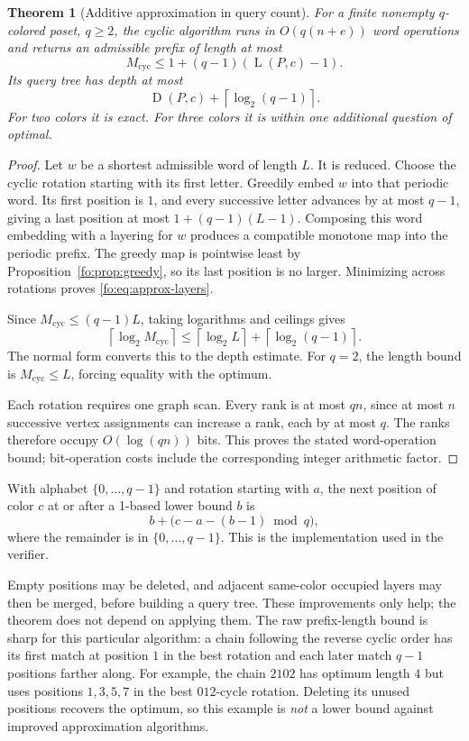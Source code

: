 \documentclass[11pt,letterpaper]{article}
\numberwithin{equation}{section}
\newtheorem{theorem}{Theorem}[section]
\theoremstyle{definition}
\theoremstyle{remark}
\theoremstyle{definition}
\newcommand{\ceil}[1]{\left\lceil#1\right\rceil}
\newcommand{\depth}{\operatorname{D}}
\newcommand{\layers}{\operatorname{L}}
\newcommand{\cyc}{\operatorname{cyc}}
\begin{document}
\begin{theorem}[Additive approximation in query count]\label{fo:thm:approx}
For a finite nonempty $q$-colored poset, $q\ge2$, the cyclic algorithm runs in
$O(q(n+e))$ word operations and returns an admissible prefix of length at most
\begin{equation}\label{fo:eq:approx-layers}
 M_{\cyc}\le 1+(q-1)(\layers(P,c)-1).
\end{equation}
Its query tree has depth at most
\begin{equation}\label{fo:eq:approx-depth}
 \depth(P,c)+\ceil{\log_2(q-1)}.
\end{equation}
For two colors it is exact. For three colors it is within one additional
question of optimal.
\end{theorem}

\begin{proof}
Let $w$ be a shortest admissible word of length $L$. It is reduced. Choose the
cyclic rotation starting with its first letter. Greedily embed $w$ into that
periodic word. Its first position is $1$, and every successive letter advances
by at most $q-1$, giving a last position at most $1+(q-1)(L-1)$.
Composing this word embedding with a layering for $w$ produces a compatible
monotone map into the periodic prefix. The greedy map is pointwise least by
Proposition~\ref{fo:prop:greedy}, so its last position is no larger. Minimizing
across rotations proves \eqref{fo:eq:approx-layers}.

Since $M_{\cyc}\le(q-1)L$, taking logarithms and ceilings gives
\[
 \ceil{\log_2M_{\cyc}}
 \le\ceil{\log_2L}+\ceil{\log_2(q-1)}.
\]
The normal form converts this to the depth estimate. For $q=2$, the length
bound is $M_{\cyc}\le L$, forcing equality with the optimum.

Each rotation requires one graph scan. Every rank is at most $qn$, since at
most $n$ successive vertex assignments can increase a rank, each by at most
$q$. The ranks therefore occupy $O(\log(qn))$ bits. This proves the stated
word-operation bound; bit-operation costs include the corresponding integer
arithmetic factor.
\end{proof}

With alphabet $\{0,\ldots,q-1\}$ and rotation starting with $a$, the next
position of color $c$ at or after a 1-based lower bound $b$ is
\[
 b+\bigl(c-a-(b-1)\bmod q\bigr),
\]
where the remainder is in $\{0,\ldots,q-1\}$. This is the implementation used
in the verifier.

Empty positions may be deleted, and adjacent same-color occupied layers may
then be merged, before building a query tree. These improvements only help;
the theorem does not depend on applying them. The raw prefix-length bound is
sharp for this particular algorithm: a chain following the reverse cyclic
order has its first match at position $1$ in the best rotation and each later
match $q-1$ positions farther along. For example, the chain $2102$ has optimum
length $4$ but uses positions $1,3,5,7$ in the best $012$-cycle rotation.
Deleting its unused positions recovers the optimum, so this example is
\emph{not} a lower bound against improved approximation algorithms.
\end{document}

